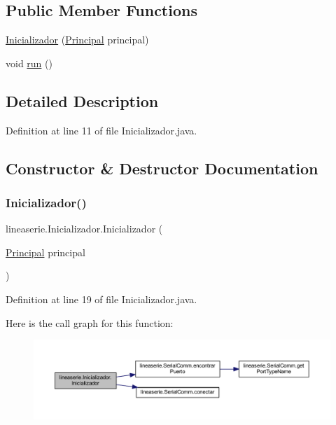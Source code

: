 \subsection*{Public Member Functions}
\begin{DoxyCompactItemize}
\item 
\mbox{\hyperlink{classlineaserie_1_1_inicializador_a86958a2a419199116654e4f259e86a66}{Inicializador}} (\mbox{\hyperlink{classvistas_1_1_principal}{Principal}} principal)
\item 
void \mbox{\hyperlink{classlineaserie_1_1_inicializador_a8163b9059ff9417835aae96eddd8464a}{run}} ()
\end{DoxyCompactItemize}


\subsection{Detailed Description}


Definition at line 11 of file Inicializador.\+java.



\subsection{Constructor \& Destructor Documentation}
\mbox{\label{classlineaserie_1_1_inicializador_a86958a2a419199116654e4f259e86a66}} 
\subsubsection{\texorpdfstring{Inicializador()}{Inicializador()}}
{\footnotesize\ttfamily lineaserie.\+Inicializador.\+Inicializador (\begin{DoxyParamCaption}\item[{\mbox{\hyperlink{classvistas_1_1_principal}{Principal}}}]{principal }\end{DoxyParamCaption})}



Definition at line 19 of file Inicializador.\+java.

Here is the call graph for this function\+:\nopagebreak
\begin{figure}[H]
\begin{center}
\leavevmode
\includegraphics[width=350pt]{classlineaserie_1_1_inicializador_a86958a2a419199116654e4f259e86a66_cgraph}
\end{center}
\end{figure}


